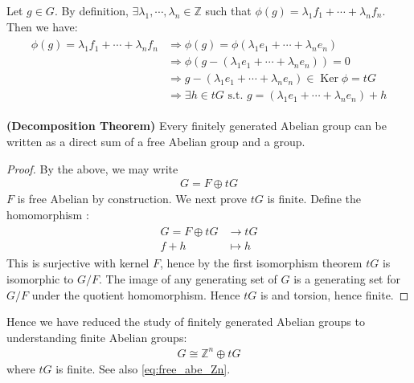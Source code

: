 \documentclass{article}
\newcommand{\bfs}[1]{\textbf{({#1}) }}
\newcommand{\Ker}{\operatorname{Ker}}
\begin{document}
Let $g \in G$. By definition, $\exists \lambda_{1}, \cdots, \lambda_{n} \in \mathbb{Z}$ such that $\phi(g)=\lambda_{1} f_{1}+\cdots+\lambda_{n} f_{n}$. Then we
have:
\begin{align*}
\begin{aligned}
\phi(g)=\lambda_{1} f_{1}+\cdots+\lambda_{n} f_{n} & \Rightarrow \phi(g)=\phi\left(\lambda_{1} e_{1}+\cdots+\lambda_{n} e_{n}\right) \\
& \Rightarrow \phi\left(g-\left(\lambda_{1} e_{1}+\cdots+\lambda_{n} e_{n}\right)\right)=0 \\
& \Rightarrow g-\left(\lambda_{1} e_{1}+\cdots+\lambda_{n} e_{n}\right) \in \Ker \phi=t G \\
& \Rightarrow \exists h \in t G \text { s.t. } g=\left(\lambda_{1} e_{1}+\cdots+\lambda_{n} e_{n}\right)+h
\end{aligned}
\end{align*}
\centerline{}
\begin{thma}{\bfs{Decomposition Theorem}}
Every finitely generated Abelian group can be written as a direct sum of a free Abelian group and a  group.
\end{thma} 
\begin{proof}
By the above, we may write
\begin{align*}
G=F \oplus t G
\end{align*}
$F$ is free Abelian by construction. We next prove $tG$ is finite. Define the homomorphism :
\begin{align*}
\begin{aligned}
G=F \oplus t G & \rightarrow t G \\
f+h & \mapsto h
\end{aligned}
\end{align*}
This is surjective with kernel $F$, hence by the first isomorphism theorem $t G$ is isomorphic to $G / F$. The image of any generating set of $G$ is a generating set for $G / F$ under the quotient homomorphism. Hence $t G$ is  and torsion, hence finite. 
\end{proof} 

Hence we have reduced the study of finitely generated Abelian groups to understanding finite Abelian groups:
\begin{align}
G\cong \mathbb{Z}^{n}\oplus tG
\end{align}
where $tG$ is finite. See also \cref{eq:free_abe_Zn}.
\end{document}
